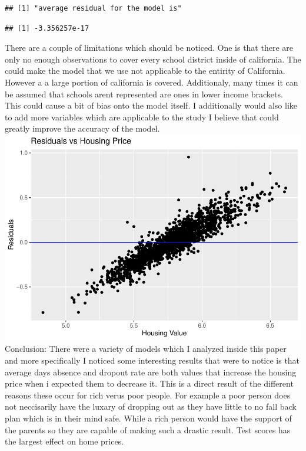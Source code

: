 \documentclass[
]{article}
\begin{document}
\begin{verbatim}
## [1] "average residual for the model is"
\end{verbatim}

\begin{verbatim}
## [1] -3.356257e-17
\end{verbatim}

There are a couple of limitations which should be noticed. One is that
there are only no enough observations to cover every school district
inside of california. The could make the model that we use not
applicable to the entirity of California. However a a large portion of
california is covered. Additionaly, many times it can be assumed that
schools arent represented are ones in lower income brackets. This could
cause a bit of bias onto the model itself. I additionally would also
like to add more variables which are applicable to the study I believe
that could greatly improve the accuracy of the model.
\includegraphics{final-writeup_files/figure-latex/unnamed-chunk-9-1.pdf}
Conclusion: There were a variety of models which I analyzed inside this
paper and more specifically I noticed some interesting results that were
to notice is that average days absence and dropout rate are both values
that increase the housing price when i expected them to decrease it.
This is a direct result of the different reasons these occur for rich
verus poor people. For example a poor person does not neccisarily have
the luxary of dropping out as they have little to no fall back plan
which is in their mind safe. While a rich person would have the support
of the parents so they are capable of making such a drastic result. Test
scores has the largest effect on home prices.
\end{document}
